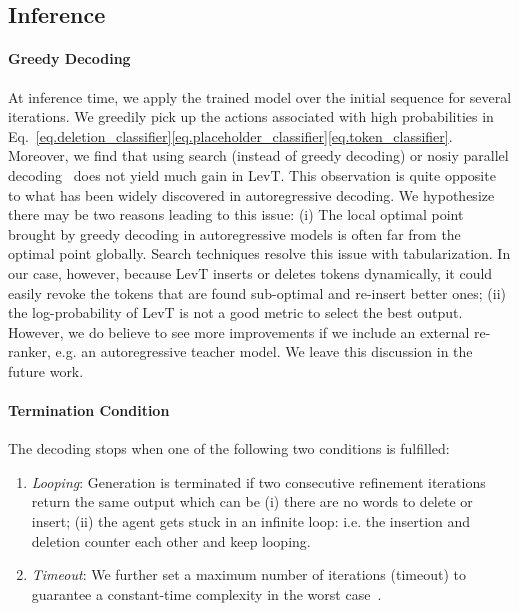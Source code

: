\documentclass{article}
\begin{document}
\subsection{Inference}
\paragraph{Greedy Decoding} 
At inference time, we apply the trained model 
over the initial sequence  
for several iterations. We greedily pick up the actions associated with high probabilities in  Eq.~\eqref{eq.deletion_classifier}\eqref{eq.placeholder_classifier}\eqref{eq.token_classifier}. 
Moreover, we find that using search (instead of greedy decoding) or nosiy parallel decoding~\citep{cho2016noisy} does not yield much gain in LevT. 
This observation is quite opposite to what has been widely discovered in autoregressive decoding.
We hypothesize there may be two reasons leading to this issue: (i) The local optimal point brought by greedy decoding in autoregressive models is often far from the optimal point globally. Search techniques resolve this issue with tabularization. In our case, however, because LevT inserts or deletes tokens dynamically, it could easily revoke the tokens that are found sub-optimal and re-insert better ones; (ii) the log-probability of LevT is not a good metric to select the best output. However, we do believe to see more improvements if we include an external re-ranker, e.g. an autoregressive teacher model. We leave this discussion in the future work.







\paragraph{Termination Condition}
The decoding stops when one of the following two conditions is fulfilled:
\begin{enumerate}[leftmargin=*]
\item \textit{Looping}:
    Generation is terminated if two consecutive refinement iterations return the same output which can be 
    (i) there are no words to delete or insert; 
    (ii) the agent gets stuck in an infinite loop: i.e.  the insertion and deletion counter each other and keep looping.


\item \textit{Timeout}: We further set a maximum number of iterations (timeout) to guarantee a constant-time complexity in the worst case~\citep{lee2018deterministic,levy2019constant}.
\end{enumerate}
\end{document}
